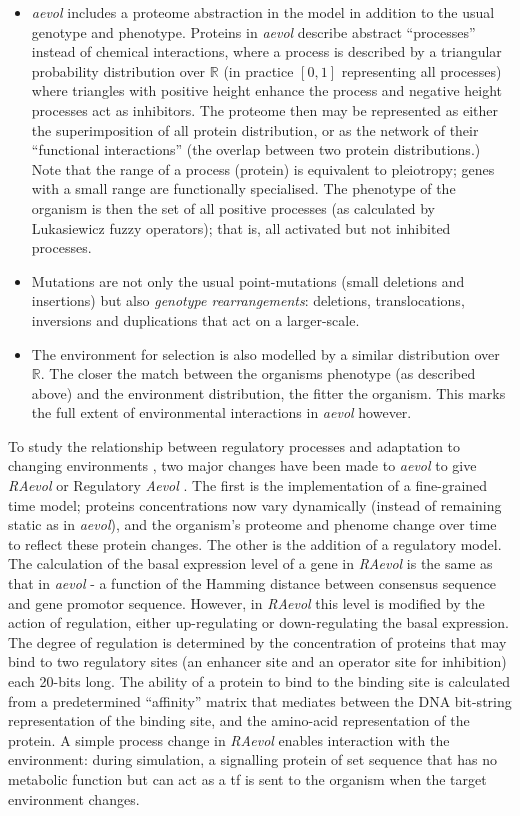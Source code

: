 \begin{itemize}
	\item \emph{aevol} includes a proteome abstraction in the model in addition to the usual genotype and phenotype. Proteins in \emph{aevol} describe abstract ``processes'' instead of chemical interactions, where a process is described by a triangular probability distribution over $\mathbb{R}$ (in practice $[0,1]$ representing all processes) where triangles with positive height enhance the process and negative height processes act as inhibitors. The proteome then may be represented as either the superimposition of all protein distribution, or as the network of their ``functional interactions'' (the overlap between two protein distributions.) Note that the range of a process (protein) is equivalent to \gls{pleiotropy}; genes with a small range are functionally specialised. The phenotype of the organism is then the set of all positive processes (as calculated by Lukasiewicz fuzzy operators); that is, all activated but not inhibited processes.
	\item Mutations are not only the usual point-mutations (small deletions and insertions) but also \emph{genotype rearrangements}: deletions, translocations, inversions and duplications that act on a larger-scale.
	\item The environment for selection is also modelled by a similar distribution over $\mathbb{R}$. The closer the match between the organisms phenotype (as described above) and the environment distribution, the fitter the organism. This marks the full extent of environmental interactions in \emph{aevol} however. 
\end{itemize}

To study the relationship between regulatory processes and adaptation to changing environments \parencite{Sanchez-Dehesa:2008uq}, two major changes have been made to \emph{aevol} to give \emph{RAevol} or Regulatory \emph{Aevol} \parencite{Beslon:2010zr,Sanchez-Dehesa:2008uq}. The first is the implementation of a fine-grained time model; proteins concentrations now vary dynamically (instead of remaining static as in \emph{aevol}), and the organism's proteome and phenome change over time to reflect these protein changes. The other is the addition of a regulatory model. The calculation of the basal expression level of a gene in \emph{RAevol} is the same as that in \emph{aevol} - a function of the Hamming distance between consensus sequence and gene promotor sequence. However, in \emph{RAevol} this level is modified by the action of regulation, either up-regulating or down-regulating the basal expression. The degree of regulation is determined by the concentration of proteins that may bind to two regulatory sites (an enhancer site and an operator site for inhibition) each 20-bits long. The ability of a protein to bind to the binding site is calculated from a predetermined ``affinity'' matrix that mediates between the DNA bit-string representation of the binding site, and the amino-acid representation of the protein. A simple process change in \emph{RAevol} enables interaction with the environment:  during simulation, a signalling protein of set sequence that has no metabolic function but can act as a \gls{tf} is sent to the organism when the target environment changes.


